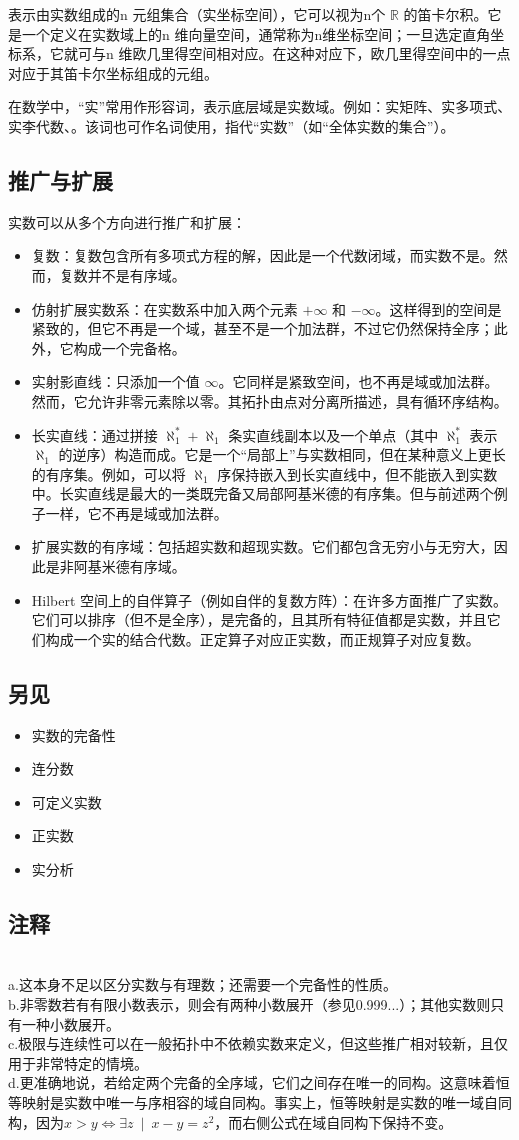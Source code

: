 表示由实数组成的n 元组集合（实坐标空间），它可以视为n个 $\mathbb{R}$ 的笛卡尔积。它是一个定义在实数域上的n 维向量空间，通常称为n维坐标空间；一旦选定直角坐标系，它就可与n 维欧几里得空间相对应。在这种对应下，欧几里得空间中的一点对应于其笛卡尔坐标组成的元组。

在数学中，“实”常用作形容词，表示底层域是实数域。例如：实矩阵、实多项式、实李代数、。该词也可作名词使用，指代“实数”（如“全体实数的集合”）。
\subsection{推广与扩展}
实数可以从多个方向进行推广和扩展：
\begin{itemize}
\item 复数：复数包含所有多项式方程的解，因此是一个代数闭域，而实数不是。然而，复数并不是有序域。
\item 仿射扩展实数系：在实数系中加入两个元素 $+\infty$ 和 $-\infty$。这样得到的空间是紧致的，但它不再是一个域，甚至不是一个加法群，不过它仍然保持全序；此外，它构成一个完备格。
\item 实射影直线：只添加一个值 $\infty$。它同样是紧致空间，也不再是域或加法群。然而，它允许非零元素除以零。其拓扑由点对分离所描述，具有循环序结构。
\item 长实直线：通过拼接 $\aleph_{1}^{*} + \aleph_{1}$ 条实直线副本以及一个单点（其中 $\aleph_{1}^{*}$ 表示 $\aleph_{1}$ 的逆序）构造而成。它是一个“局部上”与实数相同，但在某种意义上更长的有序集。例如，可以将 $\aleph_{1}$ 序保持嵌入到长实直线中，但不能嵌入到实数中。长实直线是最大的一类既完备又局部阿基米德的有序集。但与前述两个例子一样，它不再是域或加法群。
\item 扩展实数的有序域：包括超实数和超现实数。它们都包含无穷小与无穷大，因此是非阿基米德有序域。
\item Hilbert 空间上的自伴算子（例如自伴的复数方阵）：在许多方面推广了实数。它们可以排序（但不是全序），是完备的，且其所有特征值都是实数，并且它们构成一个实的结合代数。正定算子对应正实数，而正规算子对应复数。
\end{itemize}
\subsection{另见}
\begin{itemize}
\item 实数的完备性
\item 连分数
\item 可定义实数
\item 正实数
\item 实分析
\end{itemize}
\subsection{注释}\\
a.这本身不足以区分实数与有理数；还需要一个完备性的性质。\\
b.非零数若有有限小数表示，则会有两种小数展开（参见0.999...）；其他实数则只有一种小数展开。\\
c.极限与连续性可以在一般拓扑中不依赖实数来定义，但这些推广相对较新，且仅用于非常特定的情境。\\
d.更准确地说，若给定两个完备的全序域，它们之间存在唯一的同构。这意味着恒等映射是实数中唯一与序相容的域自同构。事实上，恒等映射是实数的唯一域自同构，因为$x>y \iff \exists z \ \mid \ x-y=z^{2}$，而右侧公式在域自同构下保持不变。
